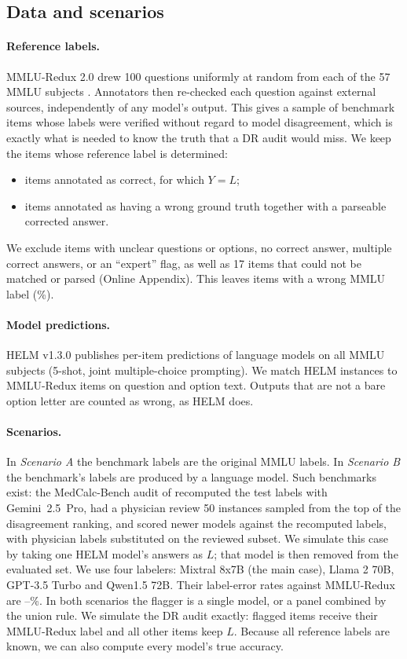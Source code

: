 \subsection{Data and scenarios}
\label{sec:data}

\paragraph{Reference labels.} MMLU-Redux 2.0 \citep{gema2025are} drew 100 questions uniformly at random from each of the 57 MMLU subjects \citep{hendrycks2021measuring}. Annotators then re-checked each question against external sources, independently of any model's output. This gives a sample of benchmark items whose labels were verified without regard to model disagreement, which is exactly what is needed to know the truth that a DR audit would miss. We keep the \nItems{} items whose reference label is determined:
\begin{itemize}
\item items annotated as correct, for which $Y=L$;
\item items annotated as having a wrong ground truth together with a parseable corrected answer.
\end{itemize}
We exclude items with unclear questions or options, no correct answer, multiple correct answers, or an ``expert'' flag, as well as 17 items that could not be matched or parsed (Online Appendix). This leaves \nLabelErrA{} items with a wrong MMLU label (\errRateA\%).

\paragraph{Model predictions.} HELM v1.3.0 \citep{liang2023holistic} publishes per-item predictions of \nModels{} language models on all MMLU subjects (5-shot, joint multiple-choice prompting). We match HELM instances to MMLU-Redux items on question and option text. Outputs that are not a bare option letter are counted as wrong, as HELM does.

\paragraph{Scenarios.} In \emph{Scenario A} the benchmark labels are the original MMLU labels. In \emph{Scenario B} the benchmark's labels are produced by a language model. Such benchmarks exist: the MedCalc-Bench audit of \citet{ye2026scalable} recomputed the test labels with Gemini~2.5~Pro, had a physician review 50 instances sampled from the top of the disagreement ranking, and scored newer models against the recomputed labels, with physician labels substituted on the reviewed subset. We simulate this case by taking one HELM model's answers as $L$; that model is then removed from the evaluated set. We use four labelers: Mixtral 8x7B (the main case), Llama 2 70B, GPT-3.5 Turbo and Qwen1.5 72B. Their label-error rates against MMLU-Redux are \errRateBmin--\errRateBmax\%. In both scenarios the flagger is a single model, or a panel combined by the union rule. We simulate the DR audit exactly: flagged items receive their MMLU-Redux label and all other items keep $L$. Because all reference labels are known, we can also compute every model's true accuracy.


